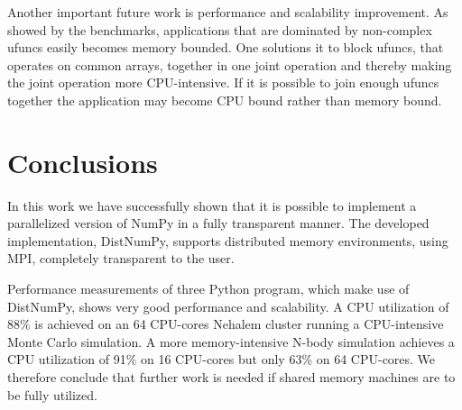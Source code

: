 \documentclass[10pt]{article}
\begin{document}
Another important future work is performance and scalability improvement. As showed by the benchmarks, applications that are dominated by non-complex ufuncs easily becomes memory bounded. One solutions it to block ufuncs, that operates on common arrays, together in one joint operation and thereby making the joint operation more CPU-intensive. If it is possible to join enough ufuncs together the application may become CPU bound rather than memory bound.


\section{Conclusions}
In this work we have successfully shown that it is possible to implement a parallelized version of NumPy in a fully transparent manner. The developed implementation, DistNumPy, supports distributed memory environments, using MPI, completely transparent to the user.

Performance measurements of three Python program, which make use of DistNumPy, shows very good performance and scalability. A CPU utilization of 88\% is achieved on an 64 CPU-cores Nehalem cluster running a CPU-intensive Monte Carlo simulation. A more memory-intensive N-body simulation achieves a CPU utilization of 91\% on 16 CPU-cores but only 63\% on 64 CPU-cores. We therefore conclude that further work is needed if shared memory machines are to be fully utilized.







\end{document}
